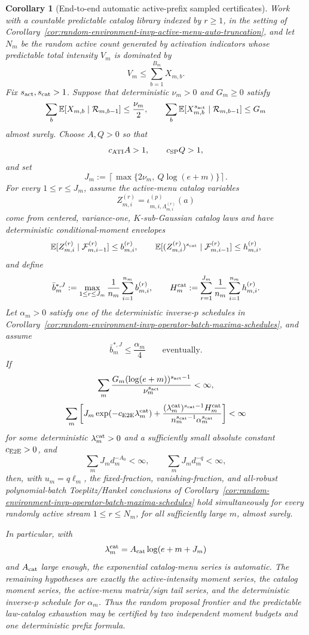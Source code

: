 \documentclass[11pt]{amsart}
\numberwithin{equation}{section}
\newtheorem{corollary}[theorem]{Corollary}
\theoremstyle{definition}
\theoremstyle{remark}
\newcommand{\Exp}{\mathbb E}
\begin{document}
\begin{corollary}[End-to-end automatic active-prefix sampled certificates]
\label{cor:random-environment-invp-end-to-end-auto-active-certificates}
Work with a countable predictable catalog library indexed by \(r\ge1\), in the
setting of
Corollary~\ref{cor:random-environment-invp-active-menu-auto-truncation}, and
let \(N_m\) be the random active count generated by activation indicators whose
predictable total intensity \(V_m\) is dominated by
\[
  V_m\le\sum_{b=1}^{B_m}X_{m,b}.
\]
Fix \(s_{\rm act},s_{\rm cat}>1\).  Suppose that deterministic
\(\nu_m>0\) and \(G_m\ge0\) satisfy
\[
  \sum_b\Exp[X_{m,b}\mid\mathcal R_{m,b-1}]\le\frac{\nu_m}{2},
  \qquad
  \sum_b\Exp[X_{m,b}^{s_{\rm act}}\mid\mathcal R_{m,b-1}]
  \le G_m
\]
almost surely.  Choose \(A,Q>0\) so that
\[
  c_{\rm ATI}A>1,\qquad c_{\rm SP}Q>1,
\]
and set
\[
  J_m:=\left\lceil\max\{2\nu_m,\ Q\log(e+m)\}\right\rceil .
\]
For every \(1\le r\le J_m\), assume the active-menu catalog variables
\[
  Z_{m,i}^{(r)}
  =\iota_{m,i,\Lambda_{m,i}^{(r)}}^{(p)}(a)
\]
come from centered, variance-one, \(K\)-sub-Gaussian catalog laws and
have deterministic conditional-moment envelopes
\[
  \Exp[Z_{m,i}^{(r)}\mid\mathcal F_{m,i-1}^{(r)}]\le b_{m,i}^{(r)},
  \qquad
  \Exp[(Z_{m,i}^{(r)})^{s_{\rm cat}}\mid\mathcal F_{m,i-1}^{(r)}]
  \le h_{m,i}^{(r)} ,
\]
and define
\[
  \bar b_m^{*,J}:=
  \max_{1\le r\le J_m}
  \frac1{n_m}\sum_{i=1}^{n_m}b_{m,i}^{(r)},\qquad
  H_m^{\rm cat}:=
  \sum_{r=1}^{J_m}\frac1{n_m}\sum_{i=1}^{n_m}h_{m,i}^{(r)} .
\]
Let \(\alpha_m>0\) satisfy one of the deterministic inverse-\(p\) schedules in
Corollary~\ref{cor:random-environment-invp-operator-batch-maxima-schedules},
and assume
\[
  \bar b_m^{*,J}\le\frac{\alpha_m}{4}
  \qquad\text{eventually}.
\]
If
\[
  \sum_m
  \frac{G_m(\log(e+m))^{s_{\rm act}-1}}{\nu_m^{s_{\rm act}}}<\infty,
\]
\[
  \sum_m
  \left[
    J_m\exp(-c_{\rm E2E}\lambda_m^{\rm cat})
    +
    \frac{(\lambda_m^{\rm cat})^{s_{\rm cat}-1}H_m^{\rm cat}}
         {n_m^{s_{\rm cat}-1}\alpha_m^{s_{\rm cat}}}
  \right]<\infty
\]
for some deterministic \(\lambda_m^{\rm cat}>0\) and a sufficiently small
absolute constant \(c_{\rm E2E}>0\), and
\[
  \sum_mJ_md_m^{-A_0}<\infty,\qquad
  \sum_mJ_md_m^{-q}<\infty,
\]
then, with \(u_m=q\ell_m\), the fixed-fraction, vanishing-fraction, and
all-robust polynomial-batch Toeplitz/Hankel conclusions of
Corollary~\ref{cor:random-environment-invp-operator-batch-maxima-schedules}
hold simultaneously for every randomly active stream \(1\le r\le N_m\), for all
sufficiently large \(m\), almost surely.

In particular, with
\[
  \lambda_m^{\rm cat}=A_{\rm cat}\log(e+m+J_m)
\]
and \(A_{\rm cat}\) large enough, the exponential catalog-menu series is
automatic.  The remaining hypotheses are exactly the active-intensity moment
series, the catalog moment series, the active-menu matrix/sign tail series, and
the deterministic inverse-\(p\) schedule for \(\alpha_m\).  Thus the random
proposal frontier and the predictable law-catalog exhaustion may be certified
by two independent moment budgets and one deterministic prefix formula.
\end{corollary}
\end{document}
